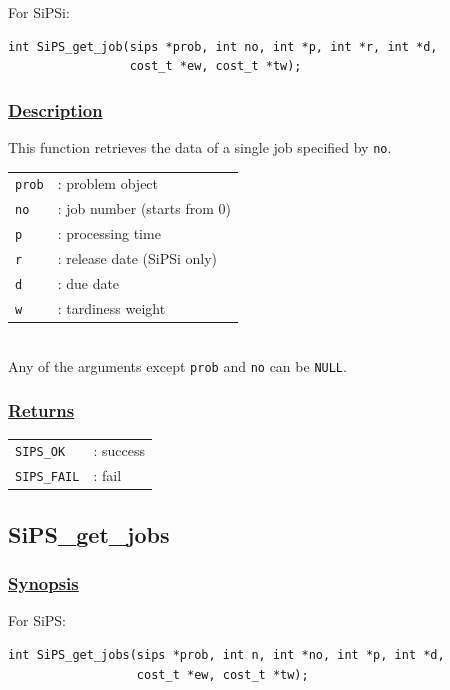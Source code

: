 \documentclass[a4paper]{book}
\begin{document}
\noindent
For SiPSi:

\begin{verbatim}
int SiPS_get_job(sips *prob, int no, int *p, int *r, int *d,
                 cost_t *ew, cost_t *tw);
\end{verbatim}


\subsubsection{\underline{Description}}

This function retrieves the data of a single job specified by \verb+no+.

\begin{tabular}{ll}
  \verb+prob+ &: problem object\\
  \verb+no+   &: job number (starts from $0$)\\
  \verb+p+    &: processing time\\
  \verb+r+    &: release date (SiPSi only)\\
  \verb+d+    &: due date\\
  \verb+w+    &: tardiness weight\\
\end{tabular}\\

Any of the arguments except \verb+prob+ and \verb+no+ can be \verb+NULL+.

\subsubsection{\underline{Returns}}

\begin{tabular}{ll}
  \verb+SIPS_OK+  &: success\\
  \verb+SIPS_FAIL+&: fail\\
\end{tabular}

\hypertarget{SiPS_get_jobs}{%
\subsection{SiPS\_get\_jobs}
}

\subsubsection{\underline{Synopsis}}

For SiPS:

\begin{verbatim}
int SiPS_get_jobs(sips *prob, int n, int *no, int *p, int *d,
                  cost_t *ew, cost_t *tw);
\end{verbatim}
\end{document}
